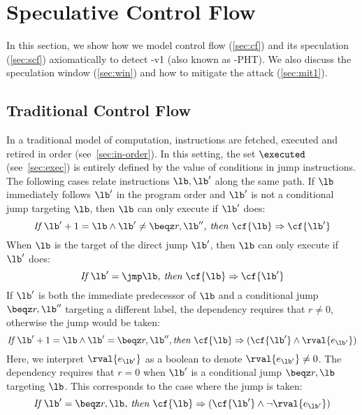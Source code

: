 \documentclass[conference]{IEEEtran}
\begin{document}
\section{Speculative Control Flow}
\label{sec:semantics}

In this section, we show how we model control flow (\autoref{sec:cf}) and its speculation (\autoref{sec:scf}) axiomatically to detect \spectre-v1 (also known as \spectre-\textsc{PHT}).
We also discuss the speculation window (\autoref{sec:win}) and how to mitigate the attack (\autoref{sec:mit1}).

\subsection{Traditional Control Flow}
\label{sec:cf}

In a traditional model of computation, instructions are fetched, executed and retired in order (see~\autoref{sec:in-order}).
In this setting, the set $\executed$ (see~\autoref{sec:exec}) is entirely defined by the value of conditions in jump instructions.
The following cases relate instructions $\lb, {\lb'} $ along the same path.
  If $\lb$ immediately follows $\lb'$ in the program order and $\lb'$ is not a conditional jump targeting $\lb$, then $\lb$ can only execute if $\lb'$ does:
  $$\textit{If }\lb'+1 = \lb \land \lb' \neq \beqz r,\lb'' \textit{, then } \cf{\lb} \Rightarrow \cf{\lb'}$$
%
  When $\lb$ is the target of the direct jump $\lb'$, then $\lb$ can only execute if $\lb'$ does:
  $$\textit{If }\lb' = \jmp \lb \textit{, then } \cf{\lb} \Rightarrow \cf{\lb'}$$
%
  If $\lb'$ is both the immediate predecessor of $\lb$ and a conditional jump $\beqz r,\lb''$ targeting a different label, the dependency requires that $r \neq 0$, otherwise the jump would be taken:
  $$\textit{If }\lb'+1 = \lb \land \lb' = \beqz r,\lb'', \textit{then } \cf{\lb} \Rightarrow {({\cf{\lb'}} \land \rval{e_{\lb'}})}$$
%
  Here, we interpret $\rval{e_{\lb'}}$ as a boolean to denote $\rval{e_{\lb'}} \neq 0$.
  The dependency requires that $r = 0$ when $\lb'$ is a conditional jump $\beqz r,\lb$ targeting $\lb$. 
  This corresponds to the case where the jump is taken: 
  $$\textit{If }\lb' = \beqz r,\lb \textit{, then } \cf{\lb} \Rightarrow {({\cf{\lb'}} \land {\neg \rval{e_{\lb'}}})}$$
\end{document}
